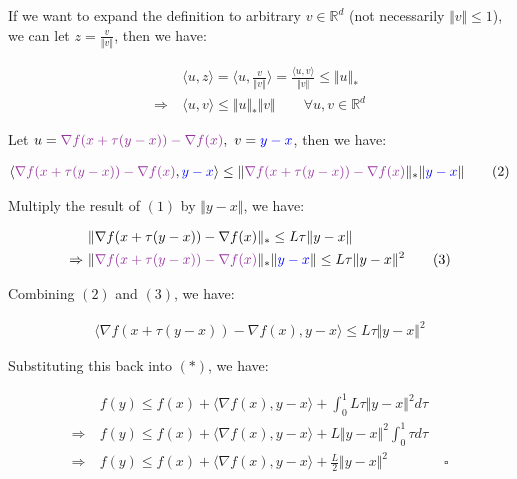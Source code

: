 \documentclass{article}
\begin{document}
If we want to expand the definition to arbitrary $v \in \mathbb{R}^d$ (not necessarily $\Vert v \Vert \leq 1$), 
we can let $z = \frac{v}{\Vert v \Vert}$, then we have:

\begin{align*}
    &\langle u, z \rangle = \langle u, \frac{v}{\Vert v \Vert} \rangle = \frac{\langle u, v \rangle}{\Vert v \Vert} \leq \Vert u \Vert_* \\
    \Rightarrow \ &\langle u, v \rangle \leq \Vert u \Vert_* \Vert v \Vert \qquad \forall u, v \in \mathbb{R}^d
\end{align*}

Let $u = \textcolor{Purple}{\nabla f ( x + \tau ( y - x ) ) - \nabla f ( x )}, \ v = \textcolor{blue}{y - x}$, then we have:

\begin{align*}
    \langle \textcolor{Purple}{\nabla f ( x + \tau ( y - x ) ) - \nabla f ( x )}, \textcolor{blue}{y - x} \rangle \leq \Vert \textcolor{Purple}{\nabla f ( x + \tau ( y - x ) ) - \nabla f ( x )} \Vert_* \Vert \textcolor{blue}{y - x} \Vert \tag{2}
\end{align*}

Multiply the result of $(1)$ by $\Vert y - x \Vert$, we have:

\begin{align*}
    &\Vert \nabla f ( x + \tau ( y - x ) ) - \nabla f ( x ) \Vert_* \leq L \tau \Vert y - x \Vert \\
    \Rightarrow \ &\Vert \textcolor{Purple}{\nabla f ( x + \tau ( y - x ) ) - \nabla f ( x )} \Vert_* \Vert \textcolor{blue}{y - x} \Vert \leq L \tau \Vert y - x \Vert^2 \tag{3}
\end{align*}

Combining $(2)$ and $(3)$, we have:

\begin{align*}
    \langle \nabla f ( x + \tau ( y - x ) ) - \nabla f ( x ), y - x \rangle \leq L \tau \Vert y - x \Vert^2
\end{align*}

Substituting this back into $(*)$, we have:

\begin{align*}
    &f(y) \leq f(x) + \langle \nabla f (x), y - x \rangle + \int_0^1 L \tau \Vert y - x \Vert^2 d\tau \\
    \Rightarrow \ &f(y) \leq f(x) + \langle \nabla f (x), y - x \rangle + L \Vert y - x \Vert^2 \int_0^1 \tau d\tau \\
    \Rightarrow \ &f(y) \leq f(x) + \langle \nabla f (x), y - x \rangle + \frac{L}{2} \Vert y - x \Vert^2 \qquad \qquad \square
\end{align*}
\end{document}
